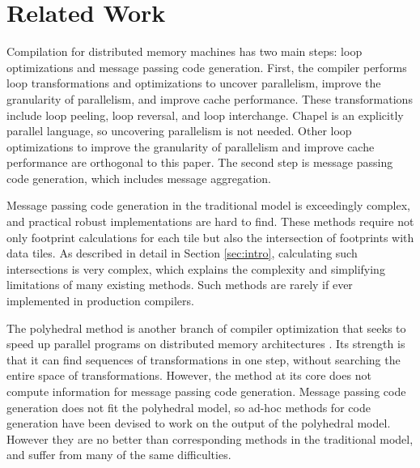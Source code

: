 \section{Related Work}\label{sec:relwork}

Compilation for distributed memory machines has two main steps: loop optimizations and message passing code generation. First, the compiler performs loop transformations and optimizations to uncover parallelism, improve the granularity of parallelism, and improve cache performance. These transformations include loop peeling, loop reversal, and loop interchange. Chapel is an explicitly parallel language, so uncovering parallelism is not needed. Other loop optimizations to improve the granularity of parallelism and improve cache performance are orthogonal to this paper. The second step is message passing code generation, which includes message aggregation.

Message passing code generation in the traditional model is exceedingly complex, and practical robust implementations are hard to find. These methods \cite{xue1997communication,goumas2006message,callahan1988compiling,ramanujam1991compile} require not only footprint calculations for each tile but also the intersection of footprints with data tiles. As described in detail in Section \ref{sec:intro}, calculating such intersections is very complex, which explains the complexity and simplifying limitations of many existing methods. Such methods are rarely if ever implemented in production compilers.

The polyhedral method is another branch of compiler optimization that seeks to speed up parallel programs on distributed memory architectures \cite{Gupta91automaticdata,chavarria2005effective,germain1995automatic, gupta1996compiling, iancu2008performance, wei1998compiling}. Its strength is that it can find sequences of transformations in one step, without searching the entire space of transformations. However, the method at its core does not compute information for message passing code generation. Message passing code generation does not fit the polyhedral model, so ad-hoc methods for code generation have been devised to work on the output of the polyhedral model. However they are no better than corresponding methods in the traditional model, and suffer from many of the same difficulties.

\begin{comment}
This writeup is very confusing. You need to clearly state that the method in [15] only works for aggregate array assignments, and not for general affine loops. [This is alluded to, but you need to reword to make this absolutely clear.

Eg: "goes beyond" is ambigious. Goes beyond in what way?
\end{comment}

